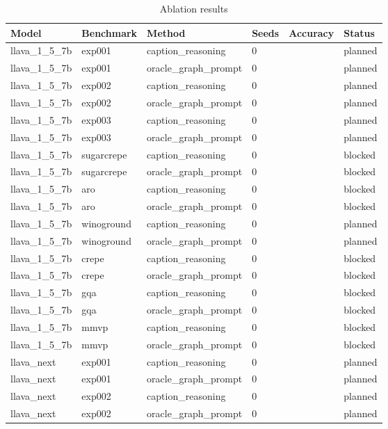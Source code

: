 \begin{table}[t]
\centering
\caption{Ablation results}
\begin{tabular}{llllll}
\toprule
Model & Benchmark & Method & Seeds & Accuracy & Status \\
\midrule
llava\_1\_5\_7b & exp001 & caption\_reasoning & 0 &  & planned \\
llava\_1\_5\_7b & exp001 & oracle\_graph\_prompt & 0 &  & planned \\
llava\_1\_5\_7b & exp002 & caption\_reasoning & 0 &  & planned \\
llava\_1\_5\_7b & exp002 & oracle\_graph\_prompt & 0 &  & planned \\
llava\_1\_5\_7b & exp003 & caption\_reasoning & 0 &  & planned \\
llava\_1\_5\_7b & exp003 & oracle\_graph\_prompt & 0 &  & planned \\
llava\_1\_5\_7b & sugarcrepe & caption\_reasoning & 0 &  & blocked \\
llava\_1\_5\_7b & sugarcrepe & oracle\_graph\_prompt & 0 &  & blocked \\
llava\_1\_5\_7b & aro & caption\_reasoning & 0 &  & blocked \\
llava\_1\_5\_7b & aro & oracle\_graph\_prompt & 0 &  & blocked \\
llava\_1\_5\_7b & winoground & caption\_reasoning & 0 &  & planned \\
llava\_1\_5\_7b & winoground & oracle\_graph\_prompt & 0 &  & planned \\
llava\_1\_5\_7b & crepe & caption\_reasoning & 0 &  & blocked \\
llava\_1\_5\_7b & crepe & oracle\_graph\_prompt & 0 &  & blocked \\
llava\_1\_5\_7b & gqa & caption\_reasoning & 0 &  & blocked \\
llava\_1\_5\_7b & gqa & oracle\_graph\_prompt & 0 &  & blocked \\
llava\_1\_5\_7b & mmvp & caption\_reasoning & 0 &  & blocked \\
llava\_1\_5\_7b & mmvp & oracle\_graph\_prompt & 0 &  & blocked \\
llava\_next & exp001 & caption\_reasoning & 0 &  & planned \\
llava\_next & exp001 & oracle\_graph\_prompt & 0 &  & planned \\
llava\_next & exp002 & caption\_reasoning & 0 &  & planned \\
llava\_next & exp002 & oracle\_graph\_prompt & 0 &  & planned \\

\end{tabular}
\end{table}
